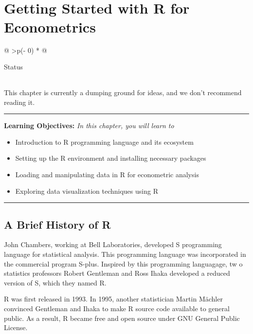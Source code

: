 \documentclass[
  letterpaper,
  paper =a4,
  twoside,
  openright,
  headsepline,
  footsepline,
  listof = totocnumbered,
  chapterprefix = true,
  firstiscover,
  parskip = full*]{scrbook}
\providecommand{\abstractname}{Learning Objectives} %
\newenvironment{objectives}[1]{%
	\hrule
	\vspace{5pt}
	\small\textbf{\abstractname: } 
	\newline
	\vspace{0.1cm}
	\small\emph{#1} %
	\itshape %
}{%
	\vspace{5pt}
	\hrule
	\vspace{0.6cm}
}
\begin{document}

\chapter{Getting Started with R for
Econometrics}\label{sec-getting-started}

\begin{longtable}[]{@{}
  >{\centering\arraybackslash}p{(\columnwidth - 0\tabcolsep) * }@{}}
\toprule\noalign{}
\begin{minipage}[b]{\linewidth}\centering
Status
\end{minipage} \\
\midrule\noalign{}
\endhead
\bottomrule\noalign{}
\endlastfoot
This chapter is currently a dumping ground for ideas, and we don't
recommend reading it. \\
\end{longtable}

\begin{objectives}{In this chapter, you will learn to}
\begin{itemize}

\item{Introduction to R programming language and its ecosystem}

\item{Setting up the R environment and installing necessary packages}

\item{Loading and manipulating data in R for econometric analysis}

\item{Exploring data visualization techniques using R}

\end{itemize}

\end{objectives}

\section{A Brief History of R}\label{a-brief-history-of-r}

John Chambers, working at Bell Laboratories, developed S programming
language for statistical analysis. This programming language was
incorporated in the commercial program S-plus. Inspired by this
programming languagage, tw o statistics professors Robert Gentleman and
Ross Ihaka developed a reduced version of S, which they named R.

R was first released in 1993. In 1995, another statistician Martin
Mächler convinced Gentleman and Ihaka to make R source code available to
general public. As a result, R became free and open source under GNU
General Public License.
\end{document}
